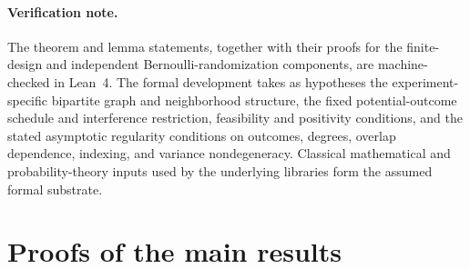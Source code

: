 \documentclass[11pt]{article}
\begin{document}
\paragraph{Verification note.}
The theorem and lemma statements, together with their proofs for the finite-design and independent Bernoulli-randomization components, are machine-checked in Lean~4. The formal development takes as hypotheses the experiment-specific bipartite graph and neighborhood structure, the fixed potential-outcome schedule and interference restriction, feasibility and positivity conditions, and the stated asymptotic regularity conditions on outcomes, degrees, overlap dependence, indexing, and variance nondegeneracy. Classical mathematical and probability-theory inputs used by the underlying libraries form the assumed formal substrate.


\section{Proofs of the main results}\label{sec:deferred-proofs}
\end{document}
